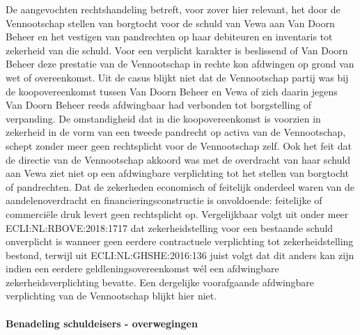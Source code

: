 \documentclass[
  dutch,
  a4paper,
]{article}
\begin{document}
De aangevochten rechtshandeling betreft, voor zover hier relevant, het door de Vennootschap stellen van borgtocht voor de schuld van Vewa aan Van Doorn Beheer en het vestigen van pandrechten op haar debiteuren en inventaris tot zekerheid van die schuld. Voor een verplicht karakter is beslissend of Van Doorn Beheer deze prestatie van de Vennootschap in rechte kon afdwingen op grond van wet of overeenkomst. Uit de casus blijkt niet dat de Vennootschap partij was bij de koopovereenkomst tussen Van Doorn Beheer en Vewa of zich daarin jegens Van Doorn Beheer reeds afdwingbaar had verbonden tot borgstelling of verpanding. De omstandigheid dat in die koopovereenkomst is voorzien in zekerheid in de vorm van een tweede pandrecht op activa van de Vennootschap, schept zonder meer geen rechtsplicht voor de Vennootschap zelf. Ook het feit dat de directie van de Vennootschap akkoord was met de overdracht van haar schuld aan Vewa ziet niet op een afdwingbare verplichting tot het stellen van borgtocht of pandrechten. Dat de zekerheden economisch of feitelijk onderdeel waren van de aandelenoverdracht en financieringsconstructie is onvoldoende: feitelijke of commerciële druk levert geen rechtsplicht op. Vergelijkbaar volgt uit onder meer ECLI:NL:RBOVE:2018:1717 dat zekerheidstelling voor een bestaande schuld onverplicht is wanneer geen eerdere contractuele verplichting tot zekerheidstelling bestond, terwijl uit ECLI:NL:GHSHE:2016:136 juist volgt dat dit anders kan zijn indien een eerdere geldleningsovereenkomst wél een afdwingbare zekerheidsverplichting bevatte. Een dergelijke voorafgaande afdwingbare verplichting van de Vennootschap blijkt hier niet.

\paragraph{Benadeling schuldeisers - overwegingen}\label{benadeling-schuldeisers---overwegingen-7}
\end{document}
